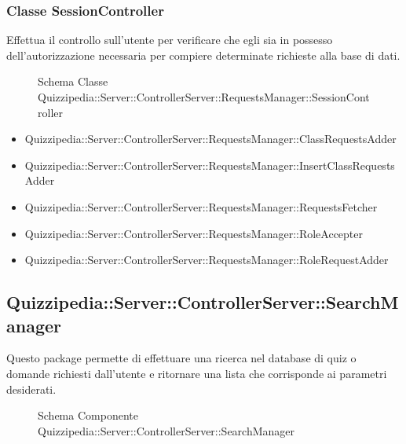 \subsubsection{Classe SessionController}
Effettua il controllo sull'utente per verificare che egli sia in possesso dell'autorizzazione necessaria per compiere determinate richieste alla base di dati.
\begin{figure}[H]
\centering
\noindent{}
\caption[Schema Classe SessionController]{Schema Classe Quizzipedia::Server::ControllerServer::RequestsManager::SessionController}
\end{figure}
\begin{itemize}
\item Quizzipedia::Server::ControllerServer::RequestsManager::ClassRequestsAdder
\item Quizzipedia::Server::ControllerServer::RequestsManager::InsertClassRequestsAdder
\item Quizzipedia::Server::ControllerServer::RequestsManager::RequestsFetcher
\item Quizzipedia::Server::ControllerServer::RequestsManager::RoleAccepter
\item Quizzipedia::Server::ControllerServer::RequestsManager::RoleRequestAdder
\end{itemize}
\subsection{Quizzipedia::Server::ControllerServer::SearchManager}
Questo package permette di effettuare una ricerca nel database di quiz o domande richiesti dall'utente e ritornare una lista che corrisponde ai parametri desiderati.
\begin{figure}[H]
\centering
\noindent{}
\caption[Schema Componente Quizzipedia::Server::ControllerServer::SearchManager]{Schema Componente Quizzipedia::Server::ControllerServer::SearchManager}
\end{figure}
